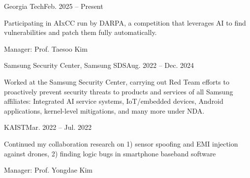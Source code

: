 
\clearpage
\begin{timeitemize}{Georgia Tech}{Feb. 2025 -- Present}
    \item Participating in AIxCC run by DARPA, a competition that leverages AI to find vulnerabilities and patch them fully automatically.
    \item Manager: Prof. Taesoo Kim
\end{timeitemize}

\begin{timeitemize}{Samsung Security Center, Samsung SDS}{Aug. 2022 -- Dec. 2024}
    \item Worked at the Samsung Security Center, carrying out Red Team efforts to proactively prevent security threats to products and services of all Samsung affiliates: Integrated AI service systems, IoT/embedded devices, Android applications, kernel-level mitigations, and many more under NDA.
\end{timeitemize}

\begin{timeitemize}{KAIST}{Mar. 2022 -- Jul. 2022}
    \item Continued my collaboration research on 1) sensor spoofing and EMI injection against drones, 2) finding logic bugs in smartphone baseband software
    \item Manager: Prof. Yongdae Kim
\end{timeitemize}

